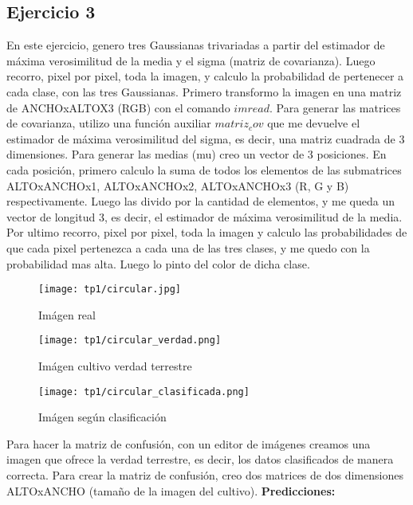 \documentclass[12pt]{article}
\begin{document}
\subsection{Ejercicio 3}
En este ejercicio, genero tres Gaussianas trivariadas a partir del estimador de máxima verosimilitud de la media y el sigma (matriz de covarianza). Luego recorro, pixel por pixel, toda la imagen, y calculo la probabilidad de pertenecer a cada clase, con las tres Gaussianas.\newline
Primero transformo la imagen en una matriz de ANCHOxALTOX3 (RGB) con el comando $imread$.\newline 
Para generar las matrices de covarianza, utilizo una función auxiliar $matriz_cov$ que me devuelve el estimador de máxima verosimilitud del sigma, es decir, una matriz cuadrada de 3 dimensiones.\newline\newline 
Para generar las medias (mu) creo un vector de 3 posiciones. En cada posición, primero calculo la suma de todos los elementos de las submatrices ALTOxANCHOx1, ALTOxANCHOx2, ALTOxANCHOx3 (R, G y B) respectivamente. Luego las divido por la cantidad de elementos, y me queda un vector de longitud 3, es decir, el estimador de máxima verosimilitud de la media.\newline\newline
Por ultimo recorro, pixel por pixel, toda la imagen y calculo las probabilidades de que cada pixel pertenezca a cada una de las tres clases, y me quedo con la probabilidad mas alta. Luego lo pinto del color de dicha clase.\newline
 \begin{figure}[H]
\centering
\texttt{[image: tp1/circular.jpg]}
\caption{Imágen real}
\texttt{[image: tp1/circular\_verdad.png]}
\caption{Imágen cultivo verdad terrestre}
\end{figure}
\begin{figure}[H]
\centering
\texttt{[image: tp1/circular\_clasificada.png]}
\caption{Imágen según clasificación}
\end{figure}
Para hacer la matriz de confusión, con un editor de imágenes creamos una imagen que ofrece la verdad terrestre, es decir, los datos clasificados de manera correcta.\newline 
Para crear la matriz de confusión, creo dos matrices de dos dimensiones ALTOxANCHO (tamaño de la imagen del cultivo).\newline\newline 
\textbf{Predicciones:}\newline
\end{document}
